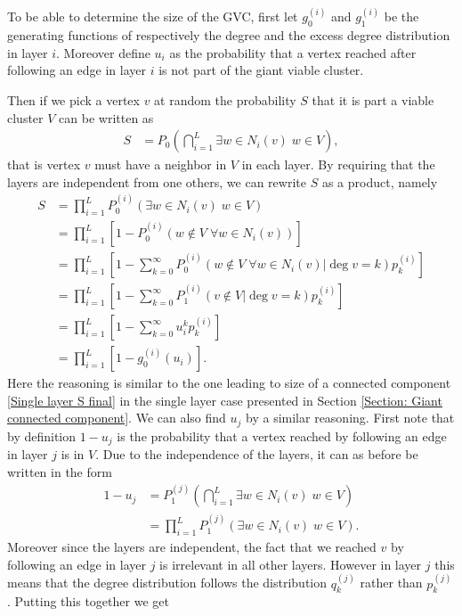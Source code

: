 \documentclass[
11pt, %
american, %
singlespacing, %
final, %
nolistspacing, %
liststotoc, %
headsepline, %
]{MastersDoctoralThesis} %
\begin{document}
To be able to determine the size of the GVC, first let $g_0^{(i)}$ and $g_1^{(i)}$ be the generating functions of respectively the degree and the excess degree distribution in layer $i$. Moreover define $u_i$ as the probability that a vertex reached after following an edge in layer $i$ is not part of the giant viable cluster.

Then if we pick a vertex $v$ at random the probability $S$ that it is part a viable cluster $V$ can be written as
\begin{align}
	S &= P_0\left(\bigcap_{i = 1}^{L} \exists w \in N_i(v) \; w \in V \right),
\end{align}
that is vertex $v$ must have a neighbor in $V$ in each layer. By requiring that the layers are independent from one others, we can rewrite $S$ as a product, namely
\begin{align}
	S &= \prod_{i = 1}^{L}  P_0^{(i)}\left(\exists w \in N_i(v) \; w \in V\right) \\
		&=\prod_{i = 1}^{L}  \left[1 - P_0^{(i)}\left(w \notin V \; \forall w \in N_i(v)\right) \right] \\
		&=\prod_{i = 1}^{L}  \left[1 - \sum_{k = 0}^{\infty} P_0^{(i)}\left(w \notin V \; \forall w \in N_i(v) | \deg{v} = k \right) p^{(i)}_k \right] \\
		&=\prod_{i = 1}^{L}  \left[1 - \sum_{k = 0}^{\infty} P_1^{(i)}\left(v \notin V | \deg{v} = k \right) p^{(i)}_k \right] \\
		&=\prod_{i = 1}^{L}  \left[1 - \sum_{k = 0}^{\infty} u_i^k p^{(i)}_k \right] \\
		&=\prod_{i = 1}^{L}  \left[1 - g_0^{(i)}(u_i) \right].\label{Multiplex GCC size final}
\end{align}
Here the reasoning is similar to the one leading to size of a connected component \eqref{Single layer S final} in the single layer case presented in Section \ref{Section: Giant connected component}. We can also find $u_j$ by a similar reasoning. First note that by definition $1 - u_j$ is the probability that a vertex reached by following an edge in layer $j$ is in $V$. Due to the independence of the layers, it can as before be written in the form
\begin{align}
	1 - u_j &= P_1^{(j)}\left(\bigcap_{i = 1}^{L} \exists w \in N_i(v) \; w \in V\right)\\
	&= \prod_{i = 1}^{L}  P_1^{(j)}\left(\exists w \in N_i(v) \; w \in V \right).
\end{align}
Moreover since the layers are independent, the fact that we reached $v$ by following an edge in layer $j$ is irrelevant in all other layers. However in layer $j$ this means that the degree distribution follows the distribution $q_k^{(j)}$ rather than $p_k^{(j)}$. Putting this together we get
\end{document}
